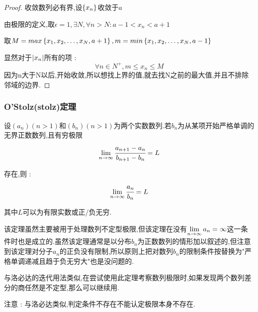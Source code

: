 {{{{\begin{enumerate}
{                  \begin{proof}
                      收敛数列必有界,设$\left\{ x_n \right\}$收敛于$a$

                      由极限的定义,取$\epsilon = 1,\exists N,\forall n > N : a - 1 < x_n < a + 1$

                      取$M = max\left\{ x_1,x_2,\dots,x_N,a + 1 \right\},m = min\left\{ x_1,x_2,\dots,x_N,a - 1 \right\}$

                      显然对于$\left\lvert x_n \right\vert$所有的项 : $$
                          \forall n \in N^+,m \leq x_n \leq M
                      $$
                      因为n大于N以后,开始收敛,所以想找上界的值,就去找N之前的最大值,并且不排除邻域的边界.

                  \end{proof}
                  }
        \end{enumerate}
    }%

    \subsubsection{O'Stolz(stolz)定理}{
        设$(a_n)(n > 1)$和$(b_n)(n > 1)$为两个实数数列.若$b_n$为从某项开始严格单调的无界正数数列,且有穷极限
        $$
            \lim\limits_{n \to \infty}\cfrac{a_{n + 1} - a_n}{b_{n + 1} - b_n} = L
        $$

        存在,则 :
        $$
            \lim\limits_{n \to \infty}\cfrac{a_n}{b_n} = L
        $$

        其中$L$可以为有限实数或正/负无穷.

        该定理虽然主要被用于处理数列不定型极限,但该定理在没有$\lim\limits_{n \to \infty}a_n = \infty$这一条件时也是成立的.虽然该定理通常是以分布$b_n$为正数数列的情形加以叙述的,但注意到该定理对分子$a_n$的正负没有限制,所以原则上把对数列$b_n$的限制条件按替换为"严格单调递减且趋于负无穷大"也是没问题的.

        与洛必达的迭代用法类似,在尝试使用此定理考察数列极限时,如果发现两个数列差分的商任然是不定型,那么可以继续用.

        注意 : 与洛必达类似,判定条件不存在不能认定极限本身不存在.
    }%

}%

}%

}%
